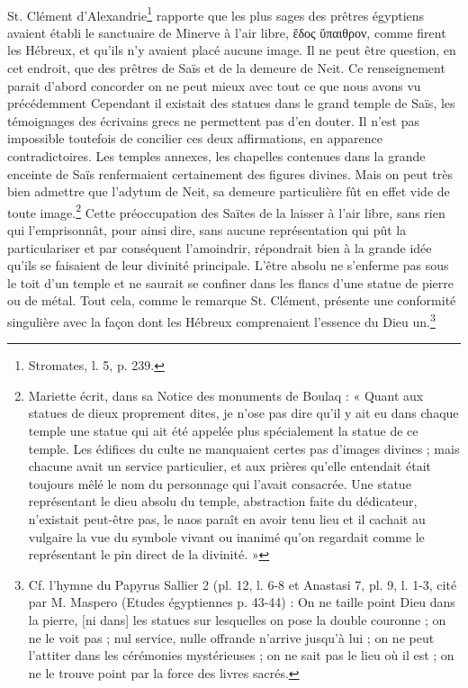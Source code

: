 \documentclass[a4paper, 11pt, oneside]{article}
\begin{document}
\paragraph{}
St. Clément d'Alexandrie\footnote{Stromates, l. 5, p. 239.} rapporte que les plus sages des prêtres égyptiens avaient établi le sanctuaire de Minerve à l'air libre, ἔδος ὕπαιθρον, comme firent les Hébreux, et qu'ils n'y avaient placé aucune image. Il ne peut être question, en cet endroit, que des prêtres de Saïs et de la demeure de Neit. Ce renseignement parait d'abord concorder on ne peut mieux avec tout ce que nous avons vu précédemment Cependant il existait des statues dans le grand temple de Saïs, les témoignages des écrivains grecs ne permettent pas d'en douter. Il n'est pas impossible toutefois de concilier ces deux affirmations, en apparence contradictoires. Les temples annexes, les chapelles contenues dans la grande enceinte de Saïs renfermaient certainement des figures divines. Mais on peut très bien admettre que l'adytum de Neit, sa demeure particulière fût en effet vide de toute image.\footnote{Mariette écrit, dans sa Notice des monuments de Boulaq : « Quant aux statues de dieux proprement dites, je n'ose pas dire qu'il y ait eu dans chaque temple une statue qui ait été appelée plus spécialement la statue de ce temple. Les édifices du culte ne manquaient certes pas d'images divines ; mais chacune avait un service particulier, et aux prières qu'elle entendait était toujours mêlé le nom du personnage qui l'avait consacrée. Une statue représentant le dieu absolu du temple, abstraction faite du dédicateur, n'existait peut-être pas, le naos paraît en avoir tenu lieu et il cachait au vulgaire la vue du symbole vivant ou inanimé qu'on regardait comme le représentant le pin direct de la divinité. »} Cette préoccupation des Saïtes de la laisser à l'air libre, sans rien qui l'emprisonnât, pour ainsi dire, sans aucune représentation qui pût la particulariser et par conséquent l'amoindrir, répondrait bien à la grande idée qu'ils se faisaient de leur divinité principale. L'être absolu ne s'enferme pas sous le toit d'un temple et ne saurait se confiner dans les flancs d'une statue de pierre ou de métal. Tout cela, comme le remarque St. Clément, présente une conformité singulière avec la façon dont les Hébreux comprenaient l'essence du Dieu un.\footnote{Cf. l'hymne du Papyrus Sallier 2 (pl. 12, l. 6-8 et Anastasi 7, pl. 9, l. 1-3, cité par M. Maspero (Etudes égyptiennes p. 43-44) : On ne taille point Dieu dans la pierre, [ni dans] les statues sur lesquelles on pose la double couronne ; on ne le voit pas ; nul service, nulle offrande n'arrive jusqu'à lui ; on ne peut l'attiter dans les cérémonies mystérieuses ; on ne sait pas le lieu où il est ; on ne le trouve point par la force des livres sacrés.}
\end{document}
